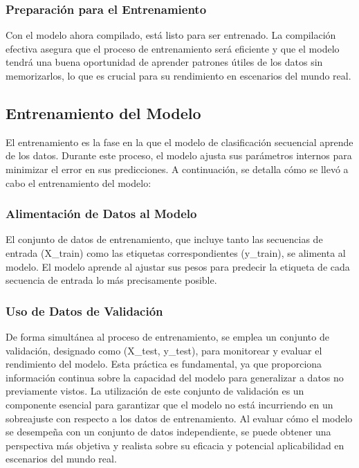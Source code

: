 \subsubsection{Preparación para el Entrenamiento} 
Con el modelo ahora compilado, está listo para ser entrenado. La compilación efectiva asegura que el proceso de entrenamiento será eficiente y que el modelo tendrá una buena oportunidad de aprender patrones útiles de los datos sin memorizarlos, lo que es crucial para su rendimiento en escenarios del mundo real.


\subsection{Entrenamiento del Modelo}

El entrenamiento es la fase en la que el modelo de clasificación secuencial aprende de los datos. Durante este proceso, el modelo ajusta sus parámetros internos para minimizar el error en sus predicciones. A continuación, se detalla cómo se llevó a cabo el entrenamiento del modelo:


\subsubsection{Alimentación de Datos al Modelo} 
El conjunto de datos de entrenamiento, que incluye tanto las secuencias de entrada (X\_train) como las etiquetas correspondientes (y\_train), se alimenta al modelo. El modelo aprende al ajustar sus pesos para predecir la etiqueta de cada secuencia de entrada lo más precisamente posible.

\subsubsection{Uso de Datos de Validación} 

De forma simultánea al proceso de entrenamiento, se emplea un conjunto de validación, designado como (X\_test, y\_test), para monitorear y evaluar el rendimiento del modelo. Esta práctica es fundamental, ya que proporciona información continua sobre la capacidad del modelo para generalizar a datos no previamente vistos. La utilización de este conjunto de validación es un componente esencial para garantizar que el modelo no está incurriendo en un sobreajuste con respecto a los datos de entrenamiento. Al evaluar cómo el modelo se desempeña con un conjunto de datos independiente, se puede obtener una perspectiva más objetiva y realista sobre su eficacia y potencial aplicabilidad en escenarios del mundo real.

